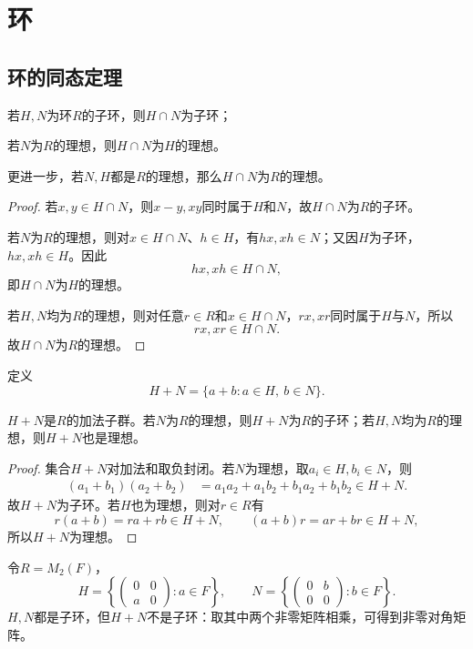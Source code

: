 \setchapterimage{}
\chapter{环}
\label{p2:ch3}

\section{环的同态定理}

\begin{proposition}
若$H,N$为环$R$的子环，则$H\cap N$为子环；

若$N$为$R$的理想，则$H\cap N$为$H$的理想。

更进一步，若$N,H$都是$R$的理想，那么$H\cap N$为$R$的理想。


\end{proposition}
\begin{proof}
若$x,y\in H\cap N$，则$x-y,xy$同时属于$H$和$N$，故$H\cap N$为$R$的子环。

若$N$为$R$的理想，则对$x\in H\cap N$、$h\in H$，有$hx,xh\in N$；又因$H$为子环，$hx,xh\in H$。因此
\[
hx,xh\in H\cap N,
\]
即$H\cap N$为$H$的理想。

若$H,N$均为$R$的理想，则对任意$r\in R$和$x\in H\cap N$，$rx,xr$同时属于$H$与$N$，所以
\[
rx,xr\in H\cap N.
\]
故$H\cap N$为$R$的理想。


\end{proof}

\begin{definition}
	定义
\[
H+N=\{a+b:a\in H,\ b\in N\}.
\]
\end{definition}
\begin{proposition}
	$H+N $是$R$的加法子群。若$N$为$R$的理想，则$H+N$为$R$的子环；若$H,N$均为$R$的理想，则$H+N$也是理想。
\end{proposition}
\begin{proof}
	集合$H+N$对加法和取负封闭。若$N$为理想，取$a_i\in H,b_i\in N$，则
	\begin{align*}
		(a_1+b_1)(a_2+b_2)
		&=a_1a_2+a_1b_2+b_1a_2+b_1b_2\in H+N.
	\end{align*}
	故$H+N$为子环。若$H$也为理想，则对$r\in R$有
	\[
	r(a+b)=ra+rb\in H+N,\qquad (a+b)r=ar+br\in H+N,
	\]
	所以$H+N$为理想。
\end{proof}
\begin{example}
令$R=M_2(F)$，
\[
H=\left\{\begin{pmatrix}0&0\\a&0\end{pmatrix}:a\in F\right\},\qquad
N=\left\{\begin{pmatrix}0&b\\0&0\end{pmatrix}:b\in F\right\}.
\]
$H,N$都是子环，但$H+N$不是子环：取其中两个非零矩阵相乘，可得到非零对角矩阵。
\end{example}

